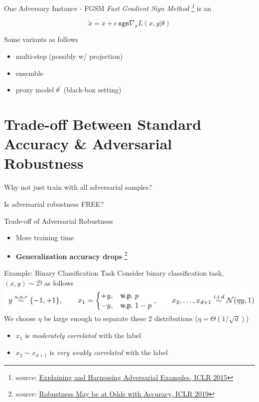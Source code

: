 \documentclass{beamer}
\begin{document}
\begin{frame}{One Adversary Instance - FGSM}
  \textit{Fast Gradient Sign Method \footnote{source: \href{http://metalearning-symposium.ml/files/vinyals.pdf}{Explaining and Harnessing Adversarial Examples, ICLR 2015}}} is an   \color{purple}{first-order} \color{orange}{white-box} \color{black}{adversary}
  
  \[
    \tilde{x} = x + \epsilon \, \texttt{sgn} \nabla_xL(x,y|\theta)
  \]

  Some variants as follows
  \begin{itemize}
    \item multi-step (possibly w/ projection)
    \item ensemble
    \item proxy model $\theta^\prime$ (black-box setting)
  \end{itemize}
\end{frame}

\section{Trade-off Between Standard Accuracy \& Adversarial Robustness}

\begin{frame}
    \center \LARGE{Why not just train with all adversarial samples?}
\end{frame}

\begin{frame}
    \center \LARGE{Is adversarial robustness FREE?}
\end{frame}

\begin{frame}{Trade-off of Adversarial Robustness}
  \begin{itemize}
    \item More training time
    \item \textbf{Generalization accuracy drops} \footnote{source: \href{http://metalearning-symposium.ml/files/vinyals.pdf}{Robustness May be at Odds with Accuracy, ICLR 2019}}
  \end{itemize}
\end{frame}

\begin{frame}{Example: Binary Classification Task}
  Consider binary classification task, $(x,y) \sim \mathcal{D}$ as follows
  \includegraphics[width=\textwidth]{fig/cls.png}
  We choose $\eta$ be large enough to separate these 2 distributions ($\eta = \Theta(1/\sqrt{d})$)  

  \begin{itemize}
    \item $x_1$ is \textit{moderately correlated} with the label
    \item $x_2 \sim x_{d+1}$ is \textit{very weakly correlated} with the label
  \end{itemize}
\end{frame}
\end{document}
